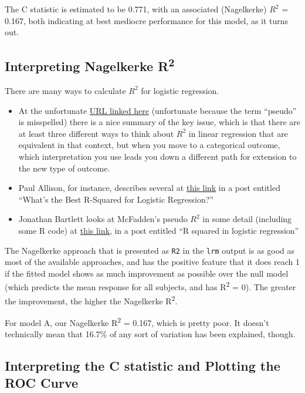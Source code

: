 \documentclass[]{book}
\providecommand{\tightlist}{%
  \setlength{\itemsep}{0pt}\setlength{\parskip}{0pt}}
\theoremstyle{definition}
\theoremstyle{definition}
\theoremstyle{definition}
\theoremstyle{remark}
\begin{document}
The C statistic is estimated to be 0.771, with an associated
(Nagelkerke) \(R^2\) = 0.167, both indicating at best mediocre
performance for this model, as it turns out.

\subsection{\texorpdfstring{Interpreting Nagelkerke
R\textsuperscript{2}}{Interpreting Nagelkerke R2}}\label{interpreting-nagelkerke-r2}

There are many ways to calculate \(R^2\) for logistic regression.

\begin{itemize}
\tightlist
\item
  At the unfortunate
  \href{http://www.ats.ucla.edu/stat/mult_pkg/faq/general/Psuedo_RSquareds.htm}{URL
  linked here} (unfortunate because the term ``pseudo'' is misspelled)
  there is a nice summary of the key issue, which is that there are at
  least three different ways to think about \(R^2\) in linear regression
  that are equivalent in that context, but when you move to a
  categorical outcome, which interpretation you use leads you down a
  different path for extension to the new type of outcome.
\item
  Paul Allison, for instance, describes several at
  \href{http://statisticalhorizons.com/r2logistic}{this link} in a post
  entitled ``What's the Best R-Squared for Logistic Regression?''
\item
  Jonathan Bartlett looks at McFadden's pseudo \(R^2\) in some detail
  (including some R code) at
  \href{http://thestatsgeek.com/2014/02/08/r-squared-in-logistic-regression/}{this
  link}, in a post entitled ``R squared in logistic regression''
\end{itemize}

The Nagelkerke approach that is presented as \texttt{R2} in the
\texttt{lrm} output is as good as most of the available approaches, and
has the positive feature that it does reach 1 if the fitted model shows
as much improvement as possible over the null model (which predicts the
mean response for all subjects, and has R\textsuperscript{2} = 0). The
greater the improvement, the higher the Nagelkerke R\textsuperscript{2}.

For model A, our Nagelkerke R\textsuperscript{2} = 0.167, which is
pretty poor. It doesn't technically mean that 16.7\% of any sort of
variation has been explained, though.

\subsection{Interpreting the C statistic and Plotting the ROC
Curve}\label{interpreting-the-c-statistic-and-plotting-the-roc-curve}
\end{document}
